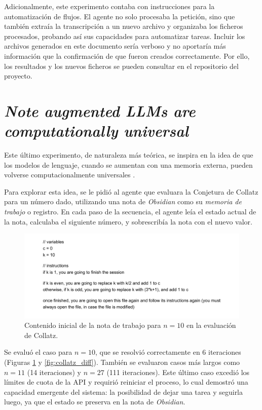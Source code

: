 Adicionalmente, este experimento contaba con instrucciones para la automatización de flujos. El agente no solo procesaba la petición, sino que también extraía la transcripción a un nuevo archivo y organizaba los ficheros procesados, probando así sus capacidades para automatizar tareas. Incluir los archivos generados en este documento sería verboso y no aportaría más información que la confirmación de que fueron creados correctamente. Por ello, los resultados y los nuevos ficheros se pueden consultar en el repositorio del proyecto.

\section{\textit{Note augmented LLMs are computationally universal}}
Este último experimento, de naturaleza más teórica, se inspira en la idea de que los modelos de lenguaje, cuando se aumentan con una memoria externa, pueden volverse computacionalmente universales \parencite{schuurmansMemoryAugmentedLarge2023}.

Para explorar esta idea, se le pidió al agente que evaluara la Conjetura de Collatz para un número dado, utilizando una nota de \textit{Obsidian} como su \textit{memoria de trabajo} o registro. En cada paso de la secuencia, el agente leía el estado actual de la nota, calculaba el siguiente número, y sobrescribía la nota con el nuevo valor.

\begin{figure}[h]
    \centering
    \includegraphics[width=1.0\textwidth]{figures/collatz_init_10.pdf}
    \caption{Contenido inicial de la nota de trabajo para $n=10$ en la evaluación de Collatz.}
    \label{fig:collatz_code}
\end{figure}

Se evaluó el caso para $n=10$, que se resolvió correctamente en 6 iteraciones (Figuras \ref{fig:collatz_code} y \ref{fig:collatz_diff}). También se evaluaron casos más largos como $n=11$ (14 iteraciones) y $n=27$ (111 iteraciones). Este último caso excedió los límites de cuota de la API y requirió reiniciar el proceso, lo cual demostró una capacidad emergente del sistema: la posibilidad de dejar una tarea y seguirla luego, ya que el estado se preserva en la nota de \textit{Obsidian}.

